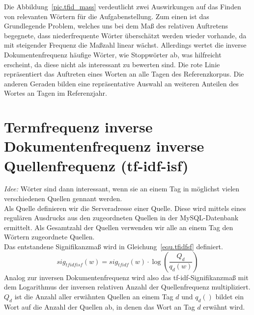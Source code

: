 Die Abbildung~\ref{pic.tfid_mass} verdeutlicht zwei Auswirkungen auf das Finden von relevanten Wörtern für die Aufgabenstellung. Zum einen ist das Grundlegende Problem, welches uns bei dem Maß des relativen Auftretens begegnete, dass niederfrequente Wörter überschätzt werden wieder vorhande, da mit steigender Frequenz die Maßzahl linear wächst. Allerdings wertet die inverse Dokumentenfrequenz häufige Wörter, wie Stoppwörter ab, was hilfreicht erscheint, da diese nicht als interessant zu bewerten sind.
Die rote Linie repräsentiert das Auftreten eines Worten an alle Tagen des Referenzkorpus. Die anderen Geraden bilden eine repräsentative Auswahl an weiteren Anteilen des Wortes an Tagen im Referenzjahr.\\

\section{Termfrequenz inverse Dokumentenfrequenz inverse Quellenfrequenz (tf-idf-isf)}
\emph{Idee: } Wörter sind dann interessant, wenn sie an einem Tag in möglichst vielen verschiedenen Quellen gennant werden.\\
Als Quelle definieren wir die Serveradresse einer Quelle. Diese wird mittels eines regulären Ausdrucks aus den zugeordneten Quellen in der MySQL-Datenbank ermittelt. Als Gesamtzahl der Quellen verwenden wir alle an einem Tag den Wörtern zugeordnete Quellen.\\
Das entstandene Signifikanzmaß wird in Gleichung~\ref{equ.tfidfsf} definiert.
\begin{equation}\label{equ.tfidfsf}
sig_{tf idf isf}(w) = sig_{tf idf}(w) \cdot \log ( \frac{Q_d}{q_d(w)})
\end{equation}
Analog zur inversen Dokumentenfrequenz wird also das tf-idf-Signifikanzmaß mit dem Logarithmus der inversen relativen Anzahl der Quellenfrequenz multipliziert. $Q_d$ ist die Anzahl aller erwähnten Quellen an einem Tag $d$ und $q_d()$ bildet ein Wort auf die Anzahl der Quellen ab, in denen das Wort an Tag $d$  erwähnt wird. 
